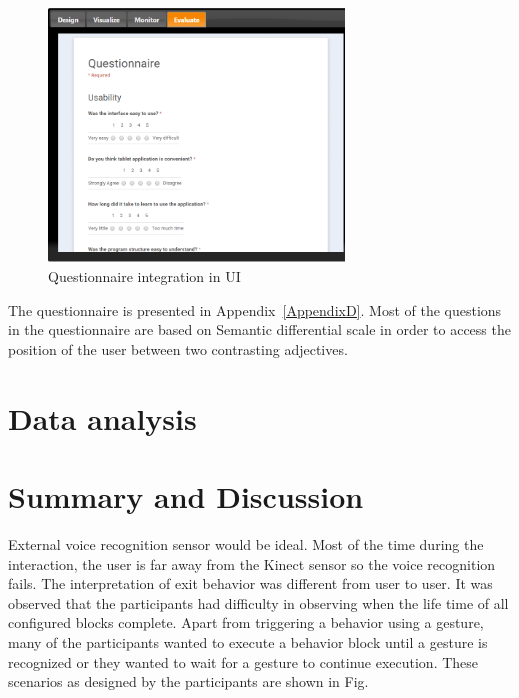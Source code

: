 \begin{figure}[H]
\centering
\includegraphics[width=0.7\textwidth]{../thesis/assets/questionnaire_integration.png}
\caption[Questionnaire integration in UI]{Questionnaire integration in UI}
\label{fig:ui_evaluate}
\end{figure}

The questionnaire is presented in Appendix~\ref{AppendixD}. Most of the questions in the questionnaire are based on Semantic differential scale in order to access the position of the user between two contrasting adjectives.

\section{Data analysis}

\section{Summary and Discussion}
External voice recognition sensor would be ideal. Most of the time during the interaction, the user is far away from the Kinect sensor so the voice recognition fails.
The interpretation of exit behavior was different from user to user. It was observed that the participants had difficulty in observing when the life time of all configured blocks complete.
Apart from triggering a behavior using a gesture, many of the participants wanted to execute a behavior block until a gesture is recognized or they wanted to wait for a gesture to continue execution. These scenarios as designed by the participants are shown in Fig.